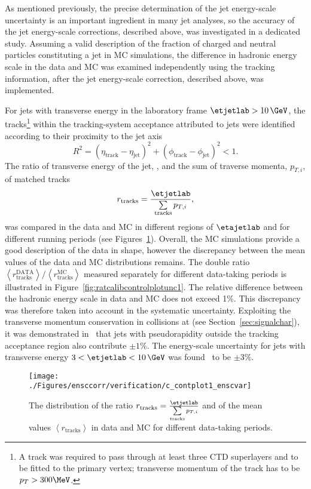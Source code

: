 As mentioned previously, the precise determination of the jet energy-scale uncertainty is an important ingredient in many jet analyses, so the accuracy of the jet energy-scale corrections, described above, was investigated in a dedicated study. Assuming a valid description of the fraction of charged and neutral particles constituting a jet in MC simulations, the difference in hadronic energy scale in the data and MC was examined independently using the tracking information, after the jet energy-scale correction, described above, was implemented. 

For jets with transverse energy in the laboratory frame $\etjetlab > 10\,\GeV$, the tracks\footnote{A track was required to pass through at least three CTD superlayers and to be fitted to the primary vertex; transverse momentum of the track has to be $p_T > 300 \MeV$.} within the tracking-system acceptance attributed to jets were identified according to their proximity to the jet axis
\begin{equation}
R^2 = \left(\eta_{\mathrm{track}} - \eta_{\mathrm{jet}}\right)^2 + \left(\phi_{\mathrm{track}} - \phi_{\mathrm{jet}}\right)^2 < 1.
\label{eq:rtrackjetcut}
\end{equation}
The ratio of transverse energy of the jet, \etjetlab, and the sum of traverse momenta, $p_{T,i}$, of matched tracks 
\begin{equation}
r_\text{tracks} = \frac{\etjetlab}{\sum\limits_{\text{tracks}}{p_{T,i}}},
\end{equation}
was compared in the data and MC in different regions of $\etajetlab$ and for different running periods (see Figures~\ref{fig:ratcalibcontrolplotunc}). Overall, the MC simulations provide a good description of the data in shape, however the discrepancy between the mean values of the data and MC distributions remains. The double ratio $\left<r_\text{tracks}^\text{DATA}\right>/\left<r_\text{tracks}^\text{MC}\right>$ measured separately for different data-taking periods is illustrated in Figure~\ref{fig:ratcalibcontrolplotunc1}. The relative difference between the hadronic energy scale in data and MC does not exceed 1\%. This discrepancy was therefore taken into account in the systematic uncertainty. Exploiting the transverse momentum conservation in \ep collisions at \hera (see Section~\ref{sec:signalchar}), it was demonstrated in~\cite{thesis:behr:2010,thesis:perrey:2011} that jets with pseudorapidity outside the tracking acceptance region also contribute $\pm 1\%$. The energy-scale uncertainty for jets with transverse energy $3<\etjetlab<10\,\GeV$ was found~\cite{thesis:behr:2010} to be $\pm 3\%$.
\begin{figure}[h!]
	\centering
		\texttt{[image: ./Figures/ensccorr/verification/c\_contplot1\_enscvar]} 
	\caption{The distribution of the ratio $r_\text{tracks} = \frac{\etjetlab}{\sum\limits_{\text{tracks}}{p_{T,i}}}$ and of the mean values $\left\langle r_\text{tracks}\right\rangle$ in data and MC for different data-taking periods.}
	\label{fig:ratcalibcontrolplotunc}
\end{figure}

